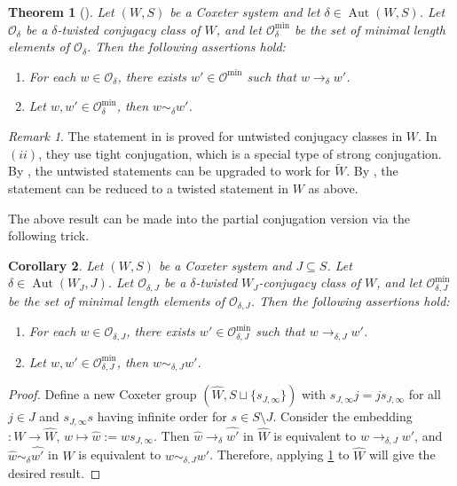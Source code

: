 \documentclass[a4paper, reqno, 14pt]{amsart}
\def\d{\delta}
\def\subset{\subseteq}
\def\co{\mathcal{O}}
\DeclareMathOperator{\Aut}{Aut}
\newtheorem{thm}{Theorem}[section]
\newtheorem{cor}[thm]{Corollary}
\theoremstyle{definition}
\theoremstyle{remark}
\newtheorem*{rmk}{Remark}
\numberwithin{equation}{section}
\numberwithin{thm}{section}
\begin{document}
        \begin{thm}[\cite{marquis2018cyclically, marquis2020structure}]\label{thm:mingeneral}
             Let $(W,S)$ be a Coxeter system and let $\delta\in \Aut(W,S)$. Let $\co_\delta$ be a $\delta$-twisted conjugacy class of $W$, and let $\co^{\min}_{\delta}$ be the set of minimal length elements of $\co_\delta$. Then the following assertions hold:
            \begin{enumerate}
                 \item For each $w \in \co_{\delta}$, there exists $w' \in \co^{\min}$ such that
            $w \rightarrow_{\d} w'$.
            
                \item Let $w, w' \in \co^{\min}_\delta$, then $w \sim_{\d} w'$.
            \end{enumerate}
        \end{thm}

        \begin{rmk}
            The statement in \cite{marquis2018cyclically} is proved for untwisted conjugacy classes in $W$. In $(ii)$, they use tight conjugation, which is a special type of strong conjugation. By \cite[Remark 6.9]{marquis2020structure}, the untwisted statements can be upgraded to work for $\tilde{W}$. By \cite[Remark 3.6]{marquis2020structure}, the statement can be reduced to a twisted statement in $W$ as above.
        \end{rmk}

        The above result can be made into the partial conjugation version via the following trick.
        
        \begin{cor}Let $(W,S)$ be a Coxeter system and $J\subset S$. Let $\delta\in \Aut(W_J,J)$. Let $\co_{\delta,J}$ be a $\delta$-twisted $W_J$-conjugacy class of $W$, and let $\co^{\min}_{\delta,J}$ be the set of minimal length elements of $\co_{\delta,J}$. Then the following assertions hold:
            \begin{enumerate}
                 \item For each $w \in \co_{\delta,J}$, there exists $w' \in \co_{\delta,J}^{\min}$ such that
            $w \rightarrow_{\d,J} w'$.
            
                \item Let $w, w' \in \co^{\min}_{\delta,J}$, then $w \sim_{\d,J} w'$.
            \end{enumerate}
        \end{cor}
        \begin{proof}
            Define a new Coxeter group $(\hat{W}, S\sqcup\{s_{J,\infty}\})$ with $s_{J,\infty} j=js_{J,\infty}$ for all $j\in J$ and $s_{J,\infty} s$ having infinite order for $s\in S\setminus J$. Consider the embedding $\hat{}: W\to \hat{W}$, $w\mapsto \hat{w}:=ws_{J,\infty}$. Then $\hat{w}\rightarrow_\d \hat{w'}$ in $\hat{W}$ is equivalent to $w \rightarrow_{\d,J} w'$, and $\hat{w}\sim_\d \hat{w'}$ in $\hat{W}$ is equivalent to $w \sim_{\d,J} w'$. Therefore, applying \cref{thm:mingeneral} to $\hat{W}$ will give the desired result.
        \end{proof}
\end{document}
